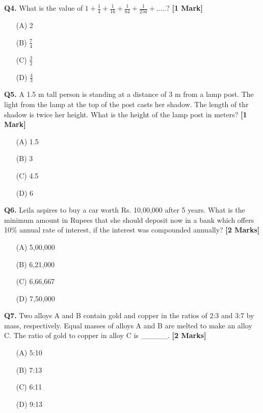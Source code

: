 \documentclass[11pt]{article}
\newcommand{\questiona}[2]{
    \noindent\textbf{Q#2.} #1 \hfill \textbf{[1 Mark]}
}
\newcommand{\questionb}[2]{
    \noindent\textbf{Q#2.} #1 \hfill \textbf{[2 Marks]}
}
\begin{document}
\vspace{0.5cm}

\questiona{What is the value of $1+\frac{1}{4}+\frac{1}{16}+\frac{1}{64}+\frac{1}{256}+$.....?}{4}
\begin{enumerate}
    \item[(A)] 2
    \item[(B)] \(\frac{7}{4}\)  
    \item[(C)] \(\frac{3}{2}\)
    \item[(D)] \(\frac{4}{3}\)
\end{enumerate}

\vspace{0.5cm}

\questiona{A 1.5 m tall person is standing at a distance of 3 m from a lamp post. The light from the lamp at the top of the post casts her shadow. The length of thr shadow is twice her height. What is the height of the lamp post in meters?}{5}
\begin{enumerate}
    \item[(A)] 1.5
    \item[(B)] 3  
    \item[(C)] 4.5
    \item[(D)] 6
\end{enumerate}

\vspace{0.5cm}

\questionb{Leila aspires to buy a car worth Rs. 10,00,000 after 5 years. What is the minimum amount in Rupees that she should deposit now in a bank which offers 10\% annual rate of interest, if the interest was compounded annually?}{6}
\begin{enumerate}
    \item[(A)] 5,00,000
    \item[(B)] 6,21,000
    \item[(C)] 6,66,667
    \item[(D)] 7,50,000
\end{enumerate}

\vspace{0.5cm}

\questionb{Two alloys A and B contain gold and copper in the ratios of 2:3 and 3:7 by mass, respectively. Equal masses of alloys A and B are melted to make an alloy C. The ratio of gold to copper in alloy C is \_\_\_\_\_.}{7}
\begin{enumerate}
    \item[(A)] 5:10
    \item[(B)] 7:13
    \item[(C)] 6:11
    \item[(D)] 9:13
\end{enumerate}
\end{document}
